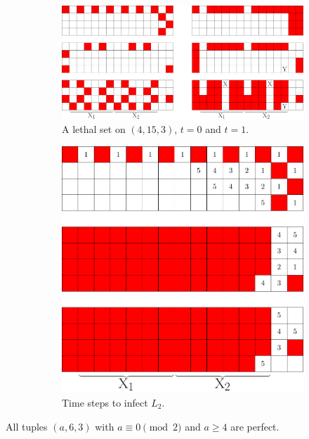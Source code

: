 \begin{figure}[]
\centering
\begin{subfigure}{0.65\textwidth}
\includegraphics[width=\textwidth]{figures/7/4x15x3.pdf}
\caption{A lethal set on $(4,15,3)$, $t=0$ and $t=1$.}
\label{fig:4x15x3}
\end{subfigure} \hfill%
\begin{subfigure}{0.3\textwidth}
\includegraphics[width=\textwidth]{figures/7/4x15x3_timesteps_numbered_heatmap.pdf}
\caption{Time steps to infect $L_2$.}
\label{fig:4x15x3_timesteps}
\end{subfigure}
\caption{}
\label{fig:}
\end{figure} 

\begin{con}
\label{con:3x6xeven}
All tuples $(a,6,3)$ with $a \equiv 0 \pmod 2$ and $a \geq 4$ are perfect. 
\end{con}

